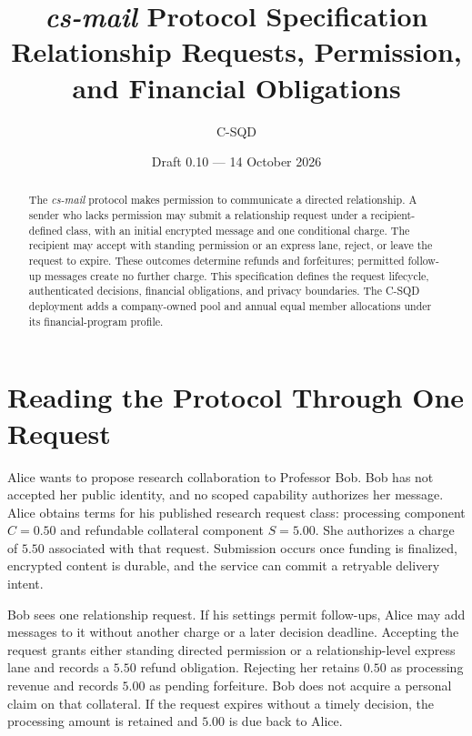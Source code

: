 \documentclass[11pt]{article}
\title{\textit{cs-mail} Protocol Specification\\\large Relationship Requests, Permission, and Financial Obligations}
\author{C-SQD}
\date{Draft 0.10 --- 14 October 2026}
\begin{document}
\maketitle

\begin{abstract}
The \textit{cs-mail} protocol makes permission to communicate a directed
relationship. A sender who lacks permission may submit a relationship request
under a recipient-defined class, with an initial encrypted message and one
conditional charge. The recipient may accept with standing permission or an
express lane, reject, or leave the request to expire. These outcomes determine refunds
and forfeitures; permitted follow-up messages create no further charge. This
specification defines the request lifecycle, authenticated decisions, financial
obligations, and privacy boundaries. The C-SQD deployment adds a company-owned
pool and annual equal member allocations under its financial-program profile.
\end{abstract}

\medskip\noindent{}\medskip

\section{Reading the Protocol Through One Request}

Alice wants to propose research collaboration to Professor Bob. Bob has not accepted her
public identity, and no scoped capability authorizes her message. Alice obtains
terms for his published research request class: processing component $C=0.50$ and refundable
collateral component $S=5.00$. She authorizes a charge of $5.50$ associated with
that request. Submission occurs once funding is finalized, encrypted content is
durable, and the service can commit a retryable delivery intent.

Bob sees one relationship request. If his settings permit follow-ups, Alice may
add messages to it without another charge or a later decision deadline. Accepting
the request grants either standing directed permission or a relationship-level
express lane and records a $5.50$ refund obligation. Rejecting
her retains $0.50$ as processing revenue and records $5.00$ as pending forfeiture.
Bob does not acquire a personal claim on that collateral. If the request expires
without a timely decision, the processing amount is retained and $5.00$ is due
back to Alice.
\end{document}
